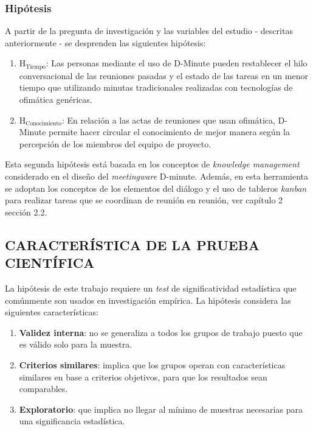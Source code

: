 \begin{enumerate}[1.]
\end{enumerate}

\subsubsection{Hipótesis}

A partir de la pregunta de investigación y las variables del estudio - descritas anteriormente - se desprenden las siguientes hipótesis:

\begin{enumerate}[1.]
	\item $\mathrm{H_{Tiempo}}$: Las personas mediante el uso de D-Minute pueden restablecer el hilo conversacional de las reuniones pasadas y el estado de las tareas en un menor tiempo que utilizando minutas tradicionales realizadas con tecnologías de ofimática genéricas.
	\item $\mathrm{H_{Conocimiento}}$: En relación a las actas de reuniones que usan ofimática, D-Minute permite hacer circular el conocimiento de mejor manera según la percepción de los miembros del equipo de proyecto.
\end{enumerate}

Esta segunda hipótesis está basada en los conceptos de \textit{knowledge management}  considerado en el diseño del \textit{meetingware} D-minute. Además, en esta herramienta se adoptan los conceptos de los elementos del diálogo y el uso de tableros \textit{kanban} para realizar tareas que se coordinan de reunión en reunión, ver capítulo 2 sección 2.2.

\subsection{CARACTERÍSTICA DE LA PRUEBA CIENTÍFICA }

La hipótesis de este trabajo requiere un \textit{test} de significatividad estadística que comúnmente son usados en investigación empírica. La hipótesis considera las siguientes características:

\begin{enumerate}[1.]
	\item \textbf{Validez interna}: no se generaliza a todos los grupos de trabajo puesto que es válido solo para la muestra.
	\item \textbf{Criterios similares}: implica que los grupos operan con características similares en base a criterios objetivos, para que los resultados sean comparables.
	\item \textbf{Exploratorio}: que implica no llegar al mínimo de muestras necesarias para una significancia estadística.

\end{enumerate}

